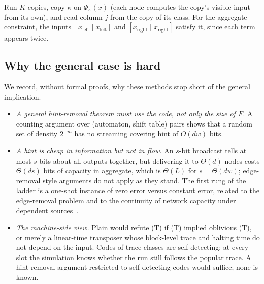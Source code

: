 \begin{outline}
Run $K$ copies, copy $\kappa$ on $\Phi_\kappa(x)$ (each node computes the copy's visible input from its
own), and read column $j$ from the copy of its class. For the aggregate constraint, the inputs
$[x_{\mathrm{left}}\mid x_{\mathrm{left}}]$ and $[x_{\mathrm{right}}\mid x_{\mathrm{right}}]$ satisfy it,
since each term appears twice.
\end{outline}

\subsection{Why the general case is hard}

We record, without formal proofs, why these methods stop short of the general implication.
\begin{itemize}[leftmargin=2em]
\item \emph{A general hint-removal theorem must use the code, not only the size of $F$.} A counting
argument over (automaton, shift table) pairs shows that a random set of density $2^{-m}$ has no
streaming covering hint of $O(dw)$ bits.
\item \emph{A hint is cheap in information but not in flow.} An $s$-bit broadcast tells at most $s$
bits about all outputs together, but delivering it to $\Theta(d)$ nodes costs $\Theta(ds)$ bits of capacity in aggregate, which is $\Theta(L)$ for $s=\Theta(dw)$; edge-removal style arguments do not apply as they stand. The first rung of the
ladder is a one-shot instance of zero error versus constant error, related to the edge-removal problem
and to the continuity of network capacity under dependent sources~\cite{LangbergEffros2021}.
\item \emph{The machine-side view.} Plain would refute (T) if (T) implied oblivious (T), or merely a
linear-time transposer whose block-level trace and halting time do not depend on the input. Codes of trace classes are
self-detecting: at every slot the simulation knows whether the run still follows the popular trace. A
hint-removal argument restricted to self-detecting codes would suffice; none is known.
\end{itemize}
